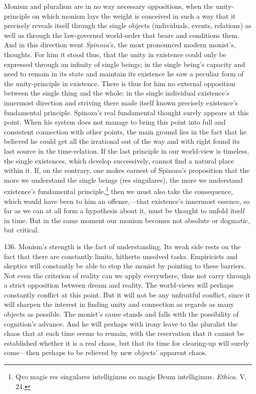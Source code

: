 \documentclass[12pt,a4paper]{book}
\newcommand{\opage}[1]{\marginnote{\footnotesize\textit{[#1]}}}
\begin{document}
Monism and pluralism are in no way necessary oppositions, when the unity-principle on which monism lays
the weight is conceived in such a way that it precisely reveals itself through the single objects
(individuals, events, relations) as well as through the law-governed world-order that bears and
conditions them. And in this direction went \emph{Spinoza}'s, the most pronounced modern monist's,
thoughts. For him it stood thus, that the unity in existence could only be expressed through an infinity
of single beings; in the single being's capacity and need to remain in its state and maintain its
existence he saw a peculiar form of the unity-principle in existence. There is thus for him no external
opposition between the single thing and the whole: in the single individual existence's innermost
direction and striving there made itself known precisely existence's fundamental principle. Spinoza's
real fundamental thought surely appears at this point. When his system does not manage to bring this
point \opage{327}into full and consistent connection with other points, the main ground lies in the fact that he
believed he could get all the irrational out of the way and with right found its last source in the
time-relation. If the last principle in our world-view is timeless, the single existences, which develop
successively, cannot find a natural place within it. If, on the contrary, one makes earnest of Spinoza's
proposition that the more we understand the single beings (res singulares), the more we understand
existence's fundamental principle,\footnote{Qvo magis res singulares intelligimus eo magis Deum
intelligimus. \emph{Ethica}. V, 24.} then we must also take the consequence, which would have been to him
an offense,---that existence's innermost essence, so far as we can at all form a hypothesis about it,
must be thought to unfold itself in time. But in the same moment our monism becomes not absolute or
dogmatic, but critical.

136. Monism's strength is the fact of understanding. Its weak side rests on the fact that there are
constantly limits, hitherto unsolved tasks. Empiricists and skeptics will constantly be able to stop the
monist by pointing to these barriers. Not even the criterion of reality can we apply everywhere, thus not
carry through a strict opposition between dream and reality. The world-views will perhaps constantly
conflict at this point. But it will not be any unfruitful conflict, since it will sharpen the interest in
finding unity and connection as regards as many objects as possible. The monist's cause stands and falls
with the possibility of cognition's advance. And he will perhaps with irony leave to the pluralist the
chaos that at each time seems to remain, with the reservation that it cannot be established whether it is
a real chaos, but that its time for clearing-up will surely come---then perhaps to be relieved by new
objects' apparent chaos.
\end{document}
